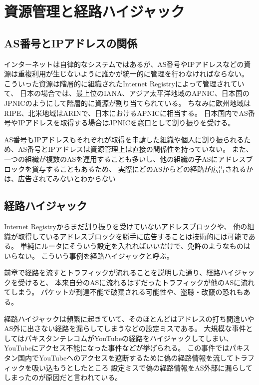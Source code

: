 \section{資源管理と経路ハイジャック}

\subsection{AS番号とIPアドレスの関係}

インターネットは自律的なシステムではあるが、AS番号やIPアドレスなどの資源は重複利用が生じないように誰かが統一的に管理を行わなければならない。
こういった資源は階層的に組織されたInternet Registryによって管理されていて、
日本の場合では、最上位のIANA、アジア太平洋地域のAPNIC、日本国のJPNICのようにして階層的に資源が割り当てられている。
ちなみに欧州地域はRIPE、北米地域はARINで、日本におけるAPNICに相当する。
日本国内でAS番号やIPアドレスを取得する場合はJPNICを窓口として割り振りを受ける。

AS番号もIPアドレスもそれぞれが取得を申請した組織や個人に割り振られるため、AS番号とIPアドレスは資源管理上は直接の関係性を持っていない。
また、一つの組織が複数のASを運用することも多いし、他の組織の子ASにアドレスブロックを貸与することもあるため、
実際にどのASからどの経路が広告されるかは、広告されてみないとわからない

\subsection{経路ハイジャック}

Internet Registryからまだ割り振りを受けていないアドレスブロックや、
他の組織が取得しているアドレスブロックを勝手に広告することは技術的には可能である。
単純にルータにそういう設定を入れればいいだけで、免許のようなものはいらない。
こういう事例を経路ハイジャックと呼ぶ。

前章で経路を流すとトラフィックが流れることを説明した通り、経路ハイジャックを受けると、
本来自分のASに流れるはずだったトラフィックが他のASに流れてしまう。
パケットが到達不能で破棄される可能性や、盗聴・改竄の恐れもある。

経路ハイジャックは頻繁に起きていて、そのほとんどはアドレスの打ち間違いやAS外に出さない経路を漏らしてしまうなどの設定ミスである。
大規模な事件としてはパキスタンテレコムがYouTubeの経路をハイジャックしてしまい、YouTubeにアクセス不能になった事件などが挙げられる。
この事件ではパキスタン国内でYouTubeへのアクセスを遮断するために偽の経路情報を流してトラフィックを吸い込もうとしたところ
設定ミスで偽の経路情報をAS外部に漏らしてしまったのが原因だと言われている。

